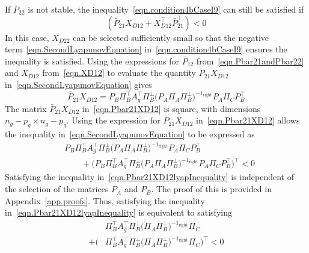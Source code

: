 If $\bar{P}_{22}$ is not stable, the inequality\ \eqref{eqn.condition4bCaseI9} can still be satisfied if
\begin{equation}
  \label{eqn.SecondLyapunovEquation}
  (\bar{P}_{21}X_{D12} + X_{D12}^{\top}\bar{P}_{21}^{\top}) < 0
\end{equation}
In this case, $X_{D22}$ can be selected sufficiently small so that the negative term\ \eqref{eqn.SecondLyapunovEquation} in\ \eqref{eqn.condition4bCaseI9} ensures the inequality is satisfied.
Using the expressions for $\bar{P}_{12}$ from\ \eqref{eqn.Pbar21andPbar22} and $X_{D12}$ from\ \eqref{eqn.XD12} to evaluate the quantity $\bar{P}_{21}X_{D12}$ in\ \eqref{eqn.SecondLyapunovEquation} gives
\begin{equation}
  \label{eqn.Pbar21XD12}
  \bar{P}_{21}X_{D12}
  =
  P_{B}\Pi_{B}^{\top}A_{g}^{\top}\Pi_{B}^{\perp}
  \bigr(P_{A}\Pi_{A}\Pi_{B}^{\perp}\bigr)^{-1_{\text{right}}}
  P_{A}\Pi_{C}P_{B}^{\top}
\end{equation}
The matrix $\bar{P}_{21}X_{D12}$ in\ \eqref{eqn.Pbar21XD12} is square, with dimensions $n_{g}-p_{g}\times n_{g}-p_{g}$.
Using the expression for $\bar{P}_{21}X_{D12}$ in\ \eqref{eqn.Pbar21XD12} allows the inequality in\ \eqref{eqn.SecondLyapunovEquation} to be expressed as
\begin{equation}
  \label{eqn.Pbar21XD12lyapInequality}
  \begin{split}
    &
    P_{B}\Pi_{B}^{\top}A_{g}^{\top}\Pi_{B}^{\perp}
    \bigr(P_{A}\Pi_{A}\Pi_{B}^{\perp}\bigr)^{-1_{\text{right}}}
    P_{A}\Pi_{C}P_{B}^{\top}  \\
    & \qquad
    +
    \bigr(
    P_{B}\Pi_{B}^{\top}A_{g}^{\top}\Pi_{B}^{\perp}
    \bigr(P_{A}\Pi_{A}\Pi_{B}^{\perp}\bigr)^{-1_{\text{right}}}
    P_{A}\Pi_{C}P_{B}^{\top}
    \bigr)^{\top}
    <0
  \end{split}
\end{equation}
Satisfying the inequality in\ \eqref{eqn.Pbar21XD12lyapInequality} is independent of the selection of the matrices $P_{A}$ and $P_{B}$.
The proof of this is provided in Appendix~\ref{app.proofs}.
Thus, satisfying the inequality in\ \eqref{eqn.Pbar21XD12lyapInequality} is equivalent to satisfying
\begin{equation}
  \label{eqn.Pbar21XD12lyapInequality3}
  \begin{split}
    &
    \Pi_{B}^{\top}A_{g}^{\top}\Pi_{B}^{\perp}
    \bigr(\Pi_{A}\Pi_{B}^{\perp}\bigr)^{-1_{\text{right}}}
    \Pi_{C}  \\
    +
    \bigr(
    &
    \Pi_{B}^{\top}A_{g}^{\top}\Pi_{B}^{\perp}
    \bigr(\Pi_{A}\Pi_{B}^{\perp}\bigr)^{-1_{\text{right}}}
    \Pi_{C}
    \bigr)^{\top}
    <0
  \end{split}
\end{equation}
